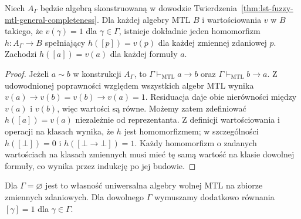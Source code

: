 \begin{wniosek}
\label{cor:ncl-lindenbaum-universal}
Niech $A_\Gamma$ będzie algebrą skonstruowaną w dowodzie
Twierdzenia~\ref{thm:lst-fuzzy-mtl-general-completeness}.
Dla każdej algebry MTL $B$ i wartościowania $v$ w $B$
takiego, że $v(\gamma)=1$ dla $\gamma\in\Gamma$, istnieje
dokładnie jeden homomorfizm $h:A_\Gamma\to B$ spełniający
$h([p])=v(p)$ dla każdej zmiennej zdaniowej $p$.
Zachodzi $h([a])=v(a)$ dla każdej formuły $a$.
\end{wniosek}
\begin{proof}
Jeżeli $a\sim b$ w konstrukcji $A_\Gamma$, to
$\Gamma\vdash_{\mathrm{MTL}}a\to b$ oraz
$\Gamma\vdash_{\mathrm{MTL}}b\to a$. Z udowodnionej
poprawności względem wszystkich algebr MTL wynika
$v(a)\to v(b)=v(b)\to v(a)=1$.
Residuacja daje obie nierówności między $v(a)$ i $v(b)$,
więc wartości są równe. Możemy zatem zdefiniować
$h([a])=v(a)$ niezależnie od reprezentanta.
Z definicji wartościowania i operacji na klasach
wynika, że $h$ jest homomorfizmem; w szczególności
$h([\bot])=0$ i $h([\bot\to\bot])=1$.
Każdy homomorfizm o zadanych wartościach na klasach
zmiennych musi mieć tę samą wartość na klasie dowolnej
formuły, co wynika przez indukcję po jej budowie.
\end{proof}
Dla $\Gamma=\varnothing$ jest to własność uniwersalna
algebry wolnej MTL na zbiorze zmiennych zdaniowych.
Dla dowolnego $\Gamma$ wymuszamy dodatkowo równania
$[\gamma]=1$ dla $\gamma\in\Gamma$.

